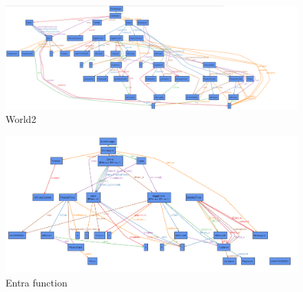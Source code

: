 \begin{figure}[H]
	\centering
	\includegraphics[width=1.8\textwidth, angle = 90]{images/world_3.png}
	\caption{World2}
	\label{figure: World2}
\end{figure}

\begin{figure}[H]
	\centering
	\includegraphics[width=1.8\textwidth, angle = 90]{images/EntraFunction}
	\caption{Entra function}
	\label{figure: Entra function}
\end{figure}